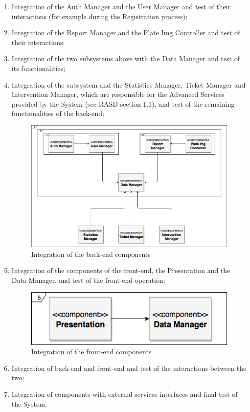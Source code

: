 \documentclass{article}
\begin{document}
\begin{enumerate}
		\item Integration of the Auth Manager and the User Manager and test of their interactions (for example during the Registration process);
		\item Integration of the Report Manager and the Plate Img Controller and test of their interactions;
		\item Integration of the two subsystems above with the Data Manager and test of its functionalities;
		\item Integration of the subsystem and the Statistics Manager, Ticket Manager and Intervention Manager, which are responsible for the Advanced Services provided by the System (see RASD section 1.1), and test of the remaining functionalities of the back-end;
			\begin{figure}[H]
			\centering
			\includegraphics[scale=0.35]{Images/Diagrams/Testing/integration_diagram_1.png}
			\caption{Integration of the back-end components}
	\end{figure}
		\item Integration of the components of the front-end, the Presentation and the Data Manager, and test of the front-end operation;
		\begin{figure}[H]
			\centering
			\includegraphics[scale=0.5]{Images/Diagrams/Testing/integration_diagram_2.png}
			\caption{Integration of the front-end components}
	\end{figure}
		\item Integration of back-end and front-end and test of the interactions between the two;
		\item Integration of components with external services interfaces and final test of the System.
	\end{enumerate}
\end{document}
